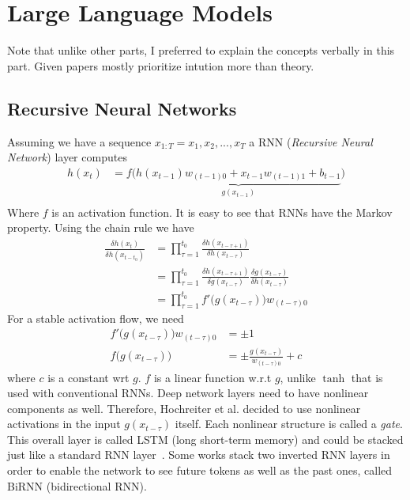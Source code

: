 \documentclass{book}
\numberwithin{equation}{subsection}
\begin{document}
\section{Large Language Models}
Note that unlike other parts, I preferred to explain the concepts verbally in this part. Given papers mostly prioritize intution more than theory.
\subsection{Recursive Neural Networks}
Assuming we have a sequence $x_{1:T} = x_1, x_2, ..., x_T$ a RNN (\textit{Recursive Neural Network}) layer computes
\begin{align}
    h(x_t) &= f\big(\underbrace{h(x_{t-1})w_{(t-1)0} + x_{t-1}w_{(t-1)1} + b_{t-1}}_{g(x_{t-1})}\big)\\
\end{align}
Where $f$ is an activation function. It is easy to see that RNNs have the Markov property. Using the chain rule we have
\begin{align}
    \frac{\delta h(x_t)}{\delta h(x_{t-t_0})}
    &= \prod_{\tau=1}^{t_0}\frac{\delta h(x_{t-\tau+1})}{\delta h(x_{t-\tau})}\\
    &= \prod_{\tau=1}^{t_0}\frac{\delta h(x_{t-\tau+1})}{\delta g(x_{t-\tau})}\frac{\delta g(x_{t-\tau})}{\delta h(x_{t-\tau})}\\
    &= \prod_{\tau=1}^{t_0}f'\Big(g(x_{t-\tau})\Big)w_{(t-\tau)0}
\end{align}
For a stable activation flow, we need
\begin{align}
    f'\Big(g(x_{t-\tau})\Big)w_{(t-\tau)0} &= \pm 1\\
    f\Big(g(x_{t-\tau})\Big) &= \pm \frac{g(x_{t-\tau})}{w_{(t-\tau)0}} + c
\end{align}
where $c$ is a constant wrt $g$. $f$ is a linear function w.r.t $g$, unlike $\tanh$ that is used with conventional RNNs. Deep network layers need to have nonlinear components as well. Therefore, Hochreiter et al. decided to use nonlinear activations in the input $g(x_{t-\tau})$ itself. Each nonlinear structure is called a \textit{gate}. This overall layer is called LSTM (long short-term memory) and could be stacked just like a standard RNN layer~\cite{hochreiter_long_1997}. Some works stack two inverted RNN layers in order to enable the network to see future tokens as well as the past ones, called BiRNN (bidirectional RNN).
\end{document}
